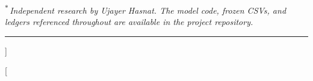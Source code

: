\documentclass[10pt,a4paper,twocolumn]{article}
\begin{document}
\begin{@twocolumnfalse}
\begin{minipage}{0.86\linewidth}
\end{minipage}\par\vspace{0.6em}
{\footnotesize\textsuperscript{$\ast$}\,\itshape Independent research by Ujayer Hasnat. The model code, frozen CSVs, and ledgers referenced throughout are available in the project repository.}\par\vspace{0.4em}
{\color{accent}\rule{\linewidth}{0.4pt}}\par
\vspace{1.0em}
\end{@twocolumnfalse}
]

\twocolumn[
\end{document}
